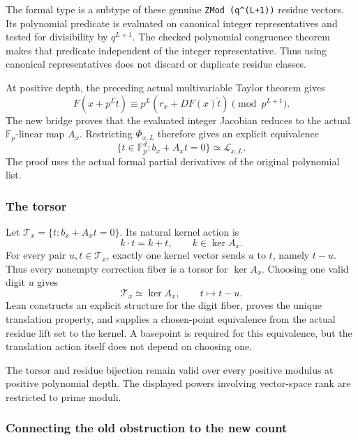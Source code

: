 The formal type  is a subtype of these genuine
\texttt{ZMod\ (q\^{}(L+1))} residue vectors. Its polynomial predicate is
evaluated on canonical integer representatives and tested for
divisibility by \(q^{L+1}\). The checked polynomial congruence theorem
makes that predicate independent of the integer representative. Thus
using canonical representatives does not discard or duplicate residue
classes.

At positive depth, the preceding actual multivariable Taylor theorem
gives \[
F(x+p^L\widetilde t)\equiv
p^L(r_x+DF(x)\widetilde t)\pmod{p^{L+1}}.
\] The new bridge proves that the evaluated integer Jacobian reduces to
the actual \(\mathbb F_p\)-linear map \(A_x\). Restricting
\(\Phi_{x,L}\) therefore gives an explicit equivalence \[
\boxed{\{t\in\mathbb F_p^d:b_x+A_xt=0\}\simeq\mathcal L_{x,L}.}
\] The proof uses the actual formal partial derivatives of the original
polynomial list.

\hypertarget{cont2:the-torsor}{%
\subsubsection{The torsor}\label{cont2:the-torsor}}

Let \(\mathcal T_x=\{t:b_x+A_xt=0\}\). Its natural kernel action is \[
k\cdot t=k+t,\qquad k\in\ker A_x.
\] For every pair \(u,t\in\mathcal T_x\), exactly one kernel vector
sends \(u\) to \(t\), namely \(t-u\). Thus every nonempty correction
fiber is a torsor for \(\ker A_x\). Choosing one valid digit \(u\) gives
\[
\mathcal T_x\simeq\ker A_x,
\qquad t\longmapsto t-u.
\] Lean constructs an explicit  structure for the
digit fiber, proves the unique translation property, and supplies a
chosen-point equivalence from the actual residue lift set to the kernel.
A basepoint is required for this equivalence, but the translation action
itself does not depend on choosing one.

The torsor and residue bijection remain valid over every positive
modulus at positive polynomial depth. The displayed powers involving
vector-space rank are restricted to prime moduli.

\hypertarget{cont2:connecting-the-old-obstruction-to-the-new-count}{%
\subsubsection{Connecting the old obstruction to the new
count}\label{cont2:connecting-the-old-obstruction-to-the-new-count}}

